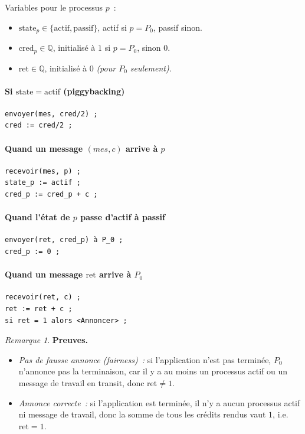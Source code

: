 \documentclass[12pt,a4paper]{article}
\theoremstyle{definition}
\theoremstyle{plain}
\theoremstyle{remark}
\newtheorem{remarque}{Remarque}[section]
\newcommand{\cred}{\mathrm{cred}}
\newcommand{\ret}{\mathrm{ret}}
\begin{document}
Variables pour le processus $p$~:
\begin{itemize}
  \item $\mathrm{state}_p \in \{\text{actif},\text{passif}\}$, actif si $p = P_0$, passif sinon.
  \item $\cred_p \in \mathbb{Q}$, initialisé à $1$ si $p = P_0$, sinon $0$.
  \item $\ret \in \mathbb{Q}$, initialisé à $0$ \textit{(pour $P_0$ seulement)}.
\end{itemize}

\paragraph{Si $\mathrm{state} = \text{actif}$ (piggybacking)}
\begin{verbatim}
envoyer(mes, cred/2) ;
cred := cred/2 ;
\end{verbatim}

\paragraph{Quand un message $(\mathit{mes}, c)$ arrive à $p$}
\begin{verbatim}
recevoir(mes, p) ;
state_p := actif ;
cred_p := cred_p + c ;
\end{verbatim}

\paragraph{Quand l'état de $p$ passe d'actif à passif}
\begin{verbatim}
envoyer(ret, cred_p) à P_0 ;
cred_p := 0 ;
\end{verbatim}

\paragraph{Quand un message $\ret$ arrive à $P_0$}
\begin{verbatim}
recevoir(ret, c) ;
ret := ret + c ;
si ret = 1 alors <Annoncer> ;
\end{verbatim}

\begin{remarque}
\textbf{Preuves.}
\begin{itemize}
  \item \emph{Pas de fausse annonce (fairness)~:} si l'application n'est pas terminée,
        $P_0$ n'annonce pas la terminaison, car il y a au moins un processus actif ou un message de travail en transit, donc $\ret \neq 1$.
  \item \emph{Annonce correcte~:} si l'application est terminée, il n'y a aucun
        processus actif ni message de travail, donc la somme de tous les crédits rendus
        vaut $1$, i.e.\ $\ret = 1$.
\end{itemize}
\end{remarque}
\end{document}
